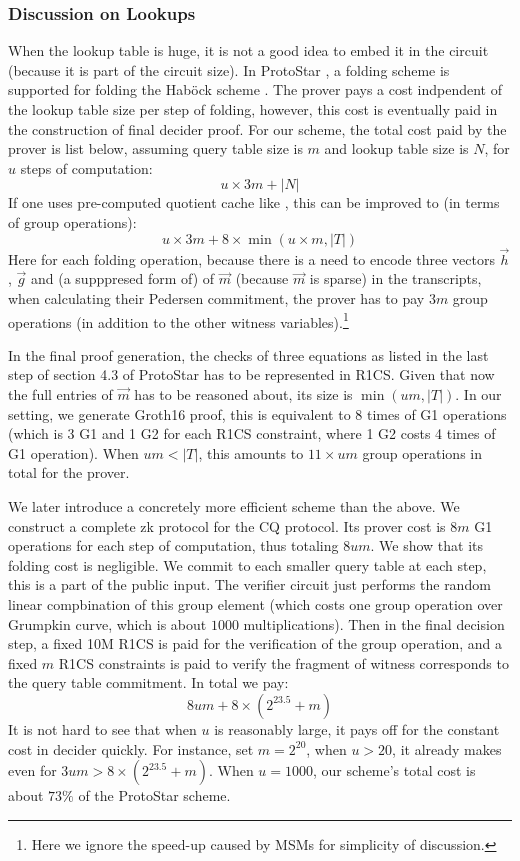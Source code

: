 {{\subsubsection{Discussion on Lookups}
When the lookup table is huge, it is not a good idea to embed
it in the circuit (because it is part of the circuit size).
In ProtoStar \cite{ProtoStar}, a folding scheme is supported for
folding the Hab\"{o}ck scheme \cite{Hab22}. The prover pays
a cost indpendent of the lookup table size per step of folding,
however, this cost is eventually paid in the construction of final
decider proof. For our scheme, the total cost paid by the prover is
list below, assuming query table size is $m$ and lookup table size
is $N$, for $u$ steps of computation:
\[
	u\times 3m + |N|
\]
If one uses pre-computed quotient cache like \cite{cq}, this can
be improved to (in terms of group operations):
\[
	u\times 3m + 8\times \min(u\times m, |T|)
\]
Here for each folding operation, because there is a need to
encode three vectors $\vec{h}$, $\vec{g}$ and (a supppresed form of)
of $\vec{m}$ (because $\vec{m}$ is sparse) in the transcripts,
when calculating their Pedersen commitment, the prover has to pay
$3m$ group operations (in addition to the other witness variables).\footnote{Here we ignore the speed-up caused by MSMs for simplicity of discussion.}

In the final proof generation, the checks of three equations
as listed in the last step of section 4.3 of ProtoStar has to
be represented in R1CS. Given that now the full entries of 
$\vec{m}$ has to be reasoned about, its size is $\min(um, |T|)$.
In our setting, we generate Groth16 proof, this is equivalent
to $8$ times of G1 operations (which is 3 G1 and 1 G2 for each R1CS
constraint, where 1 G2 costs 4 times of G1 operation).
When $um < |T|$, this amounts to $11\times um$ group operations
in total for the prover.

We later introduce a concretely more efficient scheme than the above.
We construct a complete zk protocol for the CQ protocol. Its prover cost is
$8m$ G1 operations for each step of computation, thus totaling
$8um$. We show that its folding cost is negligible.  We commit to each
smaller query table at each step, this is a part of the public input.
The verifier circuit just performs the random linear compbination
of this group element (which costs one group operation over 
Grumpkin curve, which is about $1000$ multiplications). Then in the final
decision step, a fixed 10M R1CS is paid for the verification of the
group operation, and a fixed $m$ R1CS constraints is paid to verify
the fragment of witness corresponds to the query table commitment.
In total we pay:
\[
	8um + 8\times(2^{23.5} + m)
\]
It is not hard to see that when $u$ is reasonably large, it pays off
for the constant cost in decider quickly. For instance, set $m = 2^{20}$,
when $u>20$, it already makes even for $3um>8\times(2^{23.5} + m)$.
When $u=1000$, our scheme's total cost is about $73\%$ of the ProtoStar
scheme.

}}
